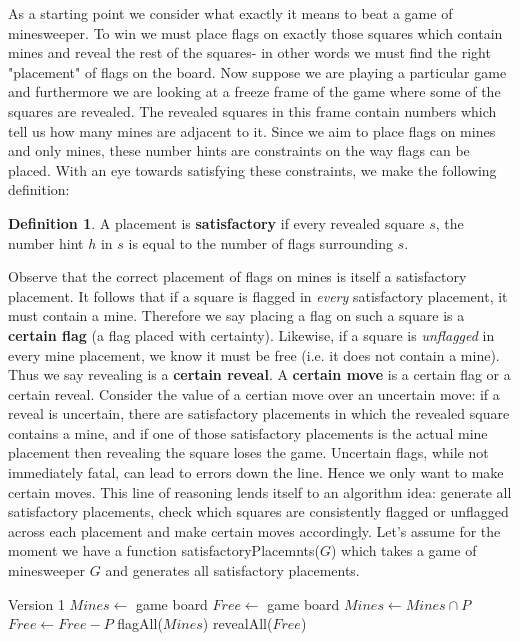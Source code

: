 \documentclass{article}
\theoremstyle{definition}
\newtheorem{definition}{Definition}
\theoremstyle{definition}
\theoremstyle{theorem}
\begin{document}
	As a starting point we consider what exactly it means to beat a game of minesweeper. To win we must place flags on exactly those squares which contain mines and reveal the rest of the squares- in other words we must find the right "placement" of flags on the board. Now suppose we are playing a particular game and furthermore we are looking at a freeze frame of the game where some of the squares are revealed. The revealed squares in this frame contain numbers which tell us how many mines are adjacent to it. Since we aim to place flags on mines and only mines, these number hints are constraints on the way flags can be placed. With an eye towards satisfying these constraints, we make the following definition:
	\begin{definition}
		A placement is \textbf{satisfactory} if every revealed square $s$, the number hint $h$ in $s$ is equal to the number of flags surrounding $s$.
	\end{definition}
	Observe that the correct placement of flags on mines is itself a satisfactory placement. It follows that if a square is flagged in \textit{every} satisfactory placement, it must contain a mine. Therefore we say placing a flag on such a square is a \textbf{certain flag} (a flag placed with certainty). Likewise, if a square is \textit{unflagged} in every mine placement, we know it must be free (i.e. it does not contain a mine). Thus we say revealing is a \textbf{certain reveal}. A \textbf{certain move} is a certain flag or a certain reveal. Consider the value of a certian move over an uncertain move: if a reveal is uncertain, there are satisfactory placements in which the revealed square contains a mine, and if one of those satisfactory placements is the actual mine placement then revealing the square loses the game. Uncertain flags, while not immediately fatal, can lead to errors down the line. Hence we only want to make certain moves. This line of reasoning lends itself to an algorithm idea: generate all satisfactory placements, check which squares are consistently flagged or unflagged across each placement and make certain moves accordingly. Let's assume for the moment we have a function satisfactoryPlacemnts($G$) which takes a game of minesweeper $G$ and generates all satisfactory placements.
	
	\begin{algorithmic}
		 \Comment Version 1
		\State $Mines \gets$ game board
		\State $Free \gets$ game board
		\State $Mines \gets Mines \cap P$
		\State $Free \gets Free -  P$
		\EndFor
		\State flagAll($Mines$)
		\State revealAll($Free$)
		\EndFunction
	\end{algorithmic}
	
\end{document}
